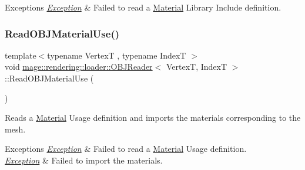 \begin{DoxyExceptions}{Exceptions}
{\em \mbox{\hyperlink{classmage_1_1_exception}{Exception}}} & Failed to read a \mbox{\hyperlink{classmage_1_1rendering_1_1_material}{Material}} Library Include definition. \\
\hline
\end{DoxyExceptions}
\mbox{\label{classmage_1_1rendering_1_1loader_1_1_o_b_j_reader_a5aa719224a08175bcbcb26873e2fb5e1}} 
\subsubsection{\texorpdfstring{Read\+O\+B\+J\+Material\+Use()}{ReadOBJMaterialUse()}}
{\footnotesize\ttfamily template$<$typename VertexT , typename IndexT $>$ \\
void \mbox{\hyperlink{classmage_1_1rendering_1_1loader_1_1_o_b_j_reader}{mage\+::rendering\+::loader\+::\+O\+B\+J\+Reader}}$<$ VertexT, IndexT $>$\+::Read\+O\+B\+J\+Material\+Use (\begin{DoxyParamCaption}{ }\end{DoxyParamCaption})\hspace{0.3cm}{\ttfamily [private]}}

Reads a \mbox{\hyperlink{classmage_1_1rendering_1_1_material}{Material}} Usage definition and imports the materials corresponding to the mesh.


\begin{DoxyExceptions}{Exceptions}
{\em \mbox{\hyperlink{classmage_1_1_exception}{Exception}}} & Failed to read a \mbox{\hyperlink{classmage_1_1rendering_1_1_material}{Material}} Usage definition. \\
\hline
{\em \mbox{\hyperlink{classmage_1_1_exception}{Exception}}} & Failed to import the materials. \\
\hline
\end{DoxyExceptions}
\mbox{\label{classmage_1_1rendering_1_1loader_1_1_o_b_j_reader_a519f333ce13777d469c63eae7ab8dcf4}} 

